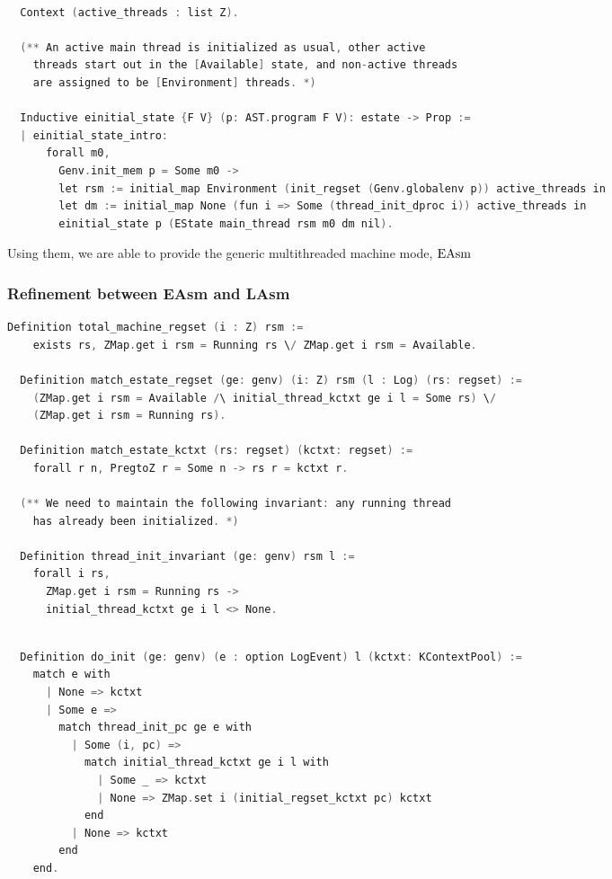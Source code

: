\begin{lstlisting}[language=C]

  Context (active_threads : list Z).

  (** An active main thread is initialized as usual, other active
    threads start out in the [Available] state, and non-active threads
    are assigned to be [Environment] threads. *)

  Inductive einitial_state {F V} (p: AST.program F V): estate -> Prop :=
  | einitial_state_intro: 
      forall m0,
        Genv.init_mem p = Some m0 ->
        let rsm := initial_map Environment (init_regset (Genv.globalenv p)) active_threads in
        let dm := initial_map None (fun i => Some (thread_init_dproc i)) active_threads in
        einitial_state p (EState main_thread rsm m0 dm nil).
\end{lstlisting}

Using them, we are able to provide the generic multithreaded machine mode, $\mathrm{EAsm}$


\subsubsection{Refinement between EAsm and LAsm}


\begin{lstlisting}[language=C]
  Definition total_machine_regset (i : Z) rsm :=
    exists rs, ZMap.get i rsm = Running rs \/ ZMap.get i rsm = Available.

  Definition match_estate_regset (ge: genv) (i: Z) rsm (l : Log) (rs: regset) :=
    (ZMap.get i rsm = Available /\ initial_thread_kctxt ge i l = Some rs) \/
    (ZMap.get i rsm = Running rs).
  
  Definition match_estate_kctxt (rs: regset) (kctxt: regset) :=
    forall r n, PregtoZ r = Some n -> rs r = kctxt r.

  (** We need to maintain the following invariant: any running thread
    has already been initialized. *)

  Definition thread_init_invariant (ge: genv) rsm l :=
    forall i rs,
      ZMap.get i rsm = Running rs ->
      initial_thread_kctxt ge i l <> None.
\end{lstlisting}


\begin{lstlisting}[language=C]

  Definition do_init (ge: genv) (e : option LogEvent) l (kctxt: KContextPool) :=
    match e with
      | None => kctxt
      | Some e =>
        match thread_init_pc ge e with
          | Some (i, pc) =>
            match initial_thread_kctxt ge i l with
              | Some _ => kctxt
              | None => ZMap.set i (initial_regset_kctxt pc) kctxt
            end
          | None => kctxt
        end
    end.
\end{lstlisting}


